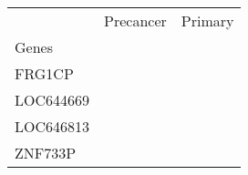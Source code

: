 \begin{tabular}{lcc}
\toprule
{} & Precancer & Primary \\
Genes     &           &         \\
\midrule
FRG1CP    &           &         \\
LOC644669 &           &         \\
LOC646813 &           &         \\
ZNF733P   &           &         \\
\bottomrule
\end{tabular}

